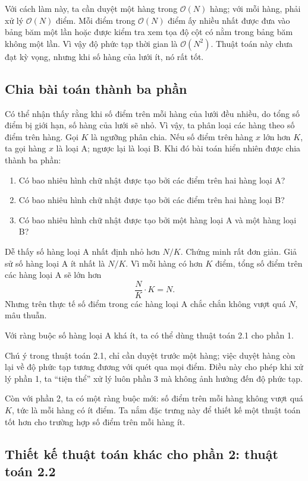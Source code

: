 \documentclass[11pt]{article}
\newcommand{\Oh}{\mathcal{O}}
\begin{document}
Với cách làm này, ta cần duyệt một hàng trong $\Oh(N)$ hàng; với mỗi hàng,
phải xử lý $\Oh(N)$ điểm. Mỗi điểm trong $\Oh(N)$ điểm ấy nhiều nhất được đưa
vào bảng băm một lần hoặc được kiểm tra xem tọa độ cột có nằm trong bảng băm
không một lần. Vì vậy độ phức tạp thời gian là $\Oh(N^2)$. Thuật toán này
chưa đạt kỳ vọng, nhưng khi số hàng của lưới ít, nó rất tốt.

\subsection{Chia bài toán thành ba phần}

Có thể nhận thấy rằng khi số điểm trên mỗi hàng của lưới đều nhiều, do tổng số
điểm bị giới hạn, số hàng của lưới sẽ nhỏ. Vì vậy, ta phân loại các hàng theo
số điểm trên hàng. Gọi $K$ là ngưỡng phân chia. Nếu số điểm trên hàng $x$ lớn
hơn $K$, ta gọi hàng $x$ là loại A; ngược lại là loại B. Khi đó bài toán hiển
nhiên được chia thành ba phần:
\begin{enumerate}
  \item Có bao nhiêu hình chữ nhật được tạo bởi các điểm trên hai hàng loại A?
  \item Có bao nhiêu hình chữ nhật được tạo bởi các điểm trên hai hàng loại B?
  \item Có bao nhiêu hình chữ nhật được tạo bởi một hàng loại A và một hàng
  loại B?
\end{enumerate}

Dễ thấy số hàng loại A nhất định nhỏ hơn $N/K$. Chứng minh rất đơn giản. Giả
sử số hàng loại A ít nhất là $N/K$. Vì mỗi hàng có hơn $K$ điểm, tổng số điểm
trên các hàng loại A sẽ lớn hơn
\[
  \frac{N}{K}\cdot K=N.
\]
Nhưng trên thực tế số điểm trong các hàng loại A chắc chắn không vượt quá
$N$, mâu thuẫn.

Với ràng buộc số hàng loại A khá ít, ta có thể dùng thuật toán 2.1 cho phần
1.

Chú ý trong thuật toán 2.1, chỉ cần duyệt trước một hàng; việc duyệt hàng còn
lại về độ phức tạp tương đương với quét qua mọi điểm. Điều này cho phép khi
xử lý phần 1, ta ``tiện thể'' xử lý luôn phần 3 mà không ảnh hưởng đến độ
phức tạp.

Còn với phần 2, ta có một ràng buộc mới: số điểm trên mỗi hàng không vượt quá
$K$, tức là mỗi hàng có ít điểm. Ta nắm đặc trưng này để thiết kế một thuật
toán tốt hơn cho trường hợp số điểm trên mỗi hàng ít.

\subsection{Thiết kế thuật toán khác cho phần 2: thuật toán 2.2}
\end{document}
